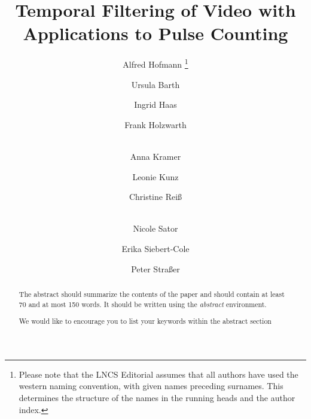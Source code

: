 \documentclass[runningheads,a4paper]{llncs}
\newcommand{\keywords}[1]{\par\addvspace\baselineskip
\noindent\keywordname\enspace\ignorespaces#1}
\begin{document}
\mainmatter  %

\title{Temporal Filtering of Video with Applications to Pulse Counting}
\pagestyle{headings}  %
%

%
%
\author{Alfred Hofmann%
\thanks{Please note that the LNCS Editorial assumes that all authors have used
the western naming convention, with given names preceding surnames. This determines
the structure of the names in the running heads and the author index.}%
\and Ursula Barth\and Ingrid Haas\and Frank Holzwarth\and\\
Anna Kramer\and Leonie Kunz\and Christine Rei\ss\and\\
Nicole Sator\and Erika Siebert-Cole\and Peter Stra\ss er}
%


%
%

\maketitle


\begin{abstract}
The abstract should summarize the contents of the paper and should
contain at least 70 and at most 150 words. It should be written using the
\emph{abstract} environment.
\keywords{We would like to encourage you to list your keywords within
the abstract section}
\end{abstract}
\end{document}
